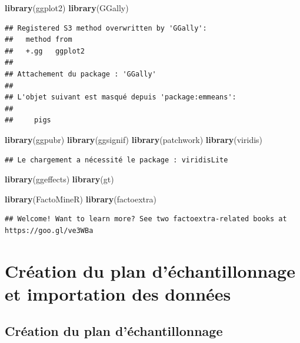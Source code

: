 \documentclass[
  french,
]{article}
\newenvironment{Shaded}{\begin{snugshade}}{\end{snugshade}}
\newcommand{\FunctionTok}[1]{\textcolor[rgb]{0.13,0.29,0.53}{\textbf{#1}}}
\newcommand{\NormalTok}[1]{#1}
\begin{document}
\begin{Shaded}
\begin{Highlighting}[]
\FunctionTok{library}\NormalTok{(ggplot2)}
\FunctionTok{library}\NormalTok{(GGally)}
\end{Highlighting}
\end{Shaded}

\begin{verbatim}
## Registered S3 method overwritten by 'GGally':
##   method from   
##   +.gg   ggplot2
## 
## Attachement du package : 'GGally'
## 
## L'objet suivant est masqué depuis 'package:emmeans':
## 
##     pigs
\end{verbatim}

\begin{Shaded}
\begin{Highlighting}[]
\FunctionTok{library}\NormalTok{(ggpubr)}
\FunctionTok{library}\NormalTok{(ggsignif)}
\FunctionTok{library}\NormalTok{(patchwork)}
\FunctionTok{library}\NormalTok{(viridis)}
\end{Highlighting}
\end{Shaded}

\begin{verbatim}
## Le chargement a nécessité le package : viridisLite
\end{verbatim}

\begin{Shaded}
\begin{Highlighting}[]
\FunctionTok{library}\NormalTok{(ggeffects)}
\FunctionTok{library}\NormalTok{(gt)}

\FunctionTok{library}\NormalTok{(FactoMineR)}
\FunctionTok{library}\NormalTok{(factoextra)}
\end{Highlighting}
\end{Shaded}

\begin{verbatim}
## Welcome! Want to learn more? See two factoextra-related books at https://goo.gl/ve3WBa
\end{verbatim}

\section{Création du plan d'échantillonnage et importation des
données}\label{cruxe9ation-du-plan-duxe9chantillonnage-et-importation-des-donnuxe9es}

\subsection{Création du plan
d'échantillonnage}\label{cruxe9ation-du-plan-duxe9chantillonnage}
\end{document}
